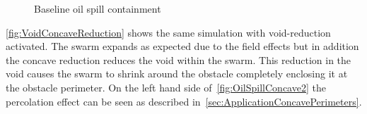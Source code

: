 \begin{figure}[H]
\centering
{}
\caption{Baseline oil spill containment}
\label{fig:OilSpillConcaveReduction1}
\end{figure}

\autoref{fig:VoidConcaveReduction} shows the same simulation with void-reduction activated. The swarm expands as expected due to the field effects but in addition the concave reduction reduces the void within the swarm. This reduction in the void causes the swarm to shrink around the obstacle completely enclosing it at the obstacle perimeter. On the left hand side of~\autoref{fig:OilSpillConcave2} the percolation effect can be seen as described in~\autoref{sec:ApplicationConcavePerimeters}.

